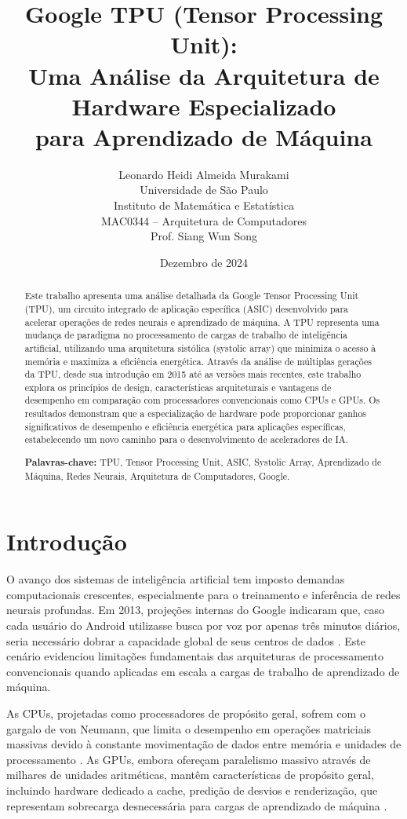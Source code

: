 \documentclass[12pt,a4paper]{article}
\title{\textbf{Google TPU (Tensor Processing Unit):\\Uma Análise da Arquitetura de Hardware Especializado\\para Aprendizado de Máquina}}
\author{
    Leonardo Heidi Almeida Murakami \\
    \small Universidade de São Paulo\\
    \small Instituto de Matemática e Estatística\\
    \small MAC0344 -- Arquitetura de Computadores\\
    \small Prof. Siang Wun Song
}
\date{Dezembro de 2024}
\begin{document}
\maketitle

\begin{abstract}
Este trabalho apresenta uma análise detalhada da Google Tensor Processing Unit (TPU), um circuito integrado de aplicação específica (ASIC) desenvolvido para acelerar operações de redes neurais e aprendizado de máquina. A TPU representa uma mudança de paradigma no processamento de cargas de trabalho de inteligência artificial, utilizando uma arquitetura sistólica (systolic array) que minimiza o acesso à memória e maximiza a eficiência energética. Através da análise de múltiplas gerações da TPU, desde sua introdução em 2015 até as versões mais recentes, este trabalho explora os princípios de design, características arquiteturais e vantagens de desempenho em comparação com processadores convencionais como CPUs e GPUs. Os resultados demonstram que a especialização de hardware pode proporcionar ganhos significativos de desempenho e eficiência energética para aplicações específicas, estabelecendo um novo caminho para o desenvolvimento de aceleradores de IA.

\textbf{Palavras-chave:} TPU, Tensor Processing Unit, ASIC, Systolic Array, Aprendizado de Máquina, Redes Neurais, Arquitetura de Computadores, Google.
\end{abstract}

\newpage
\tableofcontents
\newpage

\section{Introdução}

O avanço dos sistemas de inteligência artificial tem imposto demandas computacionais crescentes, especialmente para o treinamento e inferência de redes neurais profundas. Em 2013, projeções internas do Google indicaram que, caso cada usuário do Android utilizasse busca por voz por apenas três minutos diários, seria necessário dobrar a capacidade global de seus centros de dados \cite{google_tpu_blog_2017, thechipletter_2024}. Este cenário evidenciou limitações fundamentais das arquiteturas de processamento convencionais quando aplicadas em escala a cargas de trabalho de aprendizado de máquina.

As CPUs, projetadas como processadores de propósito geral, sofrem com o gargalo de von Neumann, que limita o desempenho em operações matriciais massivas devido à constante movimentação de dados entre memória e unidades de processamento \cite{google_cloud_tpu_docs}. As GPUs, embora ofereçam paralelismo massivo através de milhares de unidades aritméticas, mantêm características de propósito geral, incluindo hardware dedicado a cache, predição de desvios e renderização, que representam sobrecarga desnecessária para cargas de aprendizado de máquina \cite{datacamp_tpu_gpu_2024}.
\end{document}
